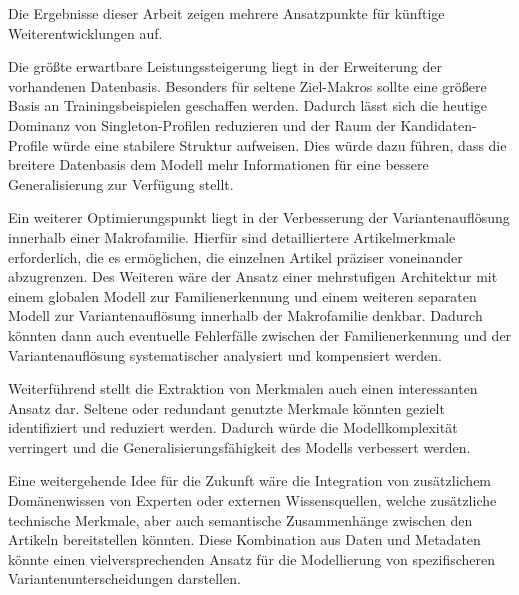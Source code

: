 Die Ergebnisse dieser Arbeit zeigen mehrere Ansatzpunkte für künftige Weiterentwicklungen auf.

Die größte erwartbare Leistungssteigerung liegt in der Erweiterung der vorhandenen Datenbasis. Besonders für seltene Ziel-Makros \parencite{EPLAN-Makros} sollte eine größere Basis an Trainingsbeispielen geschaffen werden.
Dadurch lässt sich die heutige Dominanz von Singleton-Profilen reduzieren und der Raum der Kandidaten-Profile würde eine stabilere Struktur aufweisen.
Dies würde dazu führen, dass die breitere Datenbasis dem Modell mehr Informationen für eine bessere Generalisierung zur Verfügung stellt.


Ein weiterer Optimierungspunkt liegt in der Verbesserung der Variantenauflösung innerhalb einer Makrofamilie. 
Hierfür sind detailliertere Artikelmerkmale erforderlich, die es ermöglichen, die einzelnen Artikel präziser voneinander abzugrenzen.
Des Weiteren wäre der Ansatz einer mehrstufigen Architektur mit einem globalen Modell zur Familienerkennung und einem weiteren separaten Modell zur Variantenauflösung innerhalb der Makrofamilie denkbar.
Dadurch könnten dann auch eventuelle Fehlerfälle zwischen der Familienerkennung und der Variantenauflösung systematischer analysiert und kompensiert werden.


Weiterführend stellt die Extraktion von Merkmalen auch einen interessanten Ansatz dar. Seltene oder redundant genutzte Merkmale könnten gezielt identifiziert und reduziert werden. 
Dadurch würde die Modellkomplexität verringert und die Generalisierungsfähigkeit des Modells verbessert werden.


Eine weitergehende Idee für die Zukunft wäre die Integration von zusätzlichem Domänenwissen von Experten oder externen Wissensquellen, welche zusätzliche technische Merkmale, aber auch semantische Zusammenhänge zwischen den Artikeln bereitstellen könnten.
Diese Kombination aus Daten und Metadaten könnte einen vielversprechenden Ansatz für die Modellierung von spezifischeren Variantenunterscheidungen darstellen.
